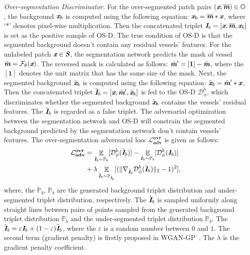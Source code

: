 \documentclass[letterpaper]{article} %
\begin{document}
\emph{Over-segmentation Discriminator.}
For the over-segmented patch pairs $(\textbf{\em x},\overline{\textbf{\em m}}) \in \mathbb{O}$,
the background $\textbf{\em x}_b$ is computed using the following equation:
$\textbf{\em x}_b=\overline{\textbf{\em m}}*\textbf{\em x}$,
where `$*$' denotes pixel-wise multiplication.
Then the concatenated triplet $\textbf{\em I}_b=[\textbf{\em x},\overline{\textbf{\em m}},\textbf{\em x}_b]$ is set as the positive sample of OS-D.
The true condition of OS-D is that the segmented background doesn't contain any residual vessels' features.
For the unlabeled patch $\textbf{\em x} \in \textbf{\em S}$,
the segmentation network predicts the mask of vessel $\ddot{\textbf{\em m}}=\mathcal{F}_{\theta}(\textbf{\em x})$.
The reversed  mask is calculated as follows:  $\ddot{\textbf{\em m}}'=[\mathbf{1}]-\ddot{\textbf{\em m}}$, where the $[\mathbf{1}]$
denotes the unit matrix that has the same size of the mask.
Next, the segmented background $\ddot{\textbf{\em x}}_b$ is computed using the following equation:
$\ddot{\textbf{\em x}}_b=\ddot{\textbf{\em m}}'*\textbf{\em x}$,
Then the concatenated triplet $\ddot{\textbf{\em I}}_b=[\textbf{\em x},\ddot{\textbf{\em m}}',\ddot{\textbf{\em x}}_b]$ is fed to the OS-D $\mathcal{D}^b_{\phi}$, which discriminates whether the segmented background $\ddot{\textbf{\em x}}_b$ contains the vessels' residual features.
The $\ddot{\textbf{\em I}}_b$ is regarded as a false triplet.
The adversarial optimization between the segmentation network and OS-D will constrain the segmented background predicted by the segmentation network
don't contain vessels' features.
The over-segmentation adversarial loss $\mathbf{\mathcal{L}^{ovr}_{adv}}$ is given as follows:
\begin{equation}\label{eq4}
\begin{split}
\mathbf{\mathcal{L}^{ovr}_{adv}}& = \mathop{\mathbb{E}}\limits_{\ddot{\textbf{\em I}}_b \sim \ddot{\mathbb{P}}_b} [\mathcal{D}^b_{\phi}(\ddot{\textbf{\em I}}_b)]
-\mathop{\mathbb{E}}\limits_{\textbf{\em I}_b \sim \mathbb{P}_b} [\mathcal{D}^b_{\phi}(\textbf{\em I}_b)]  \\
& +\lambda \mathop{\mathbb{E}}\limits_{\hat{\textbf{\em I}}_b\sim \mathbb{P}_{\hat{\textbf{\em I}}_b}} [(\|\nabla_{\hat{\textbf{\em I}}_b} \mathcal{D}^{b}_{\phi}(\hat{\textbf{\em I}}_b)\|_{2} - 1)^2],
\end{split}
\end{equation}
where, the $\ddot{\mathbb{P}}_b$, $\mathbb{P}_b$ are the generated background triplet distribution and under-segmented triplet distribution, respectively.
The $\hat{\textbf{\em I}}_b$ is sampled uniformly along straight lines between pairs of points sampled from the generated background triplet distribution $\ddot{\mathbb{P}}_b$ and the under-segmented triplet distribution $\mathbb{P}_b$.
The $\hat{\textbf{\em I}}_b=\varepsilon \textbf{\em I}_b+(1-\varepsilon)\ddot{\textbf{\em I}}_b$, where the $\varepsilon$ is a random number between $0$ and $1$.
The second term (gradient penalty) is firstly proposed in WGAN-GP~\cite{gulrajani2017improved}. The $\lambda$ is the gradient penalty coefficient.
\end{document}

